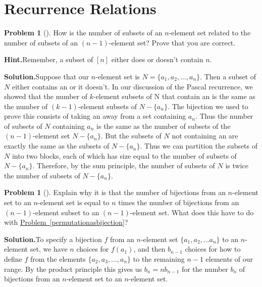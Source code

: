 \documentclass[10pt,]{book}
\theoremstyle{plain}
\theoremstyle{definition}
\newtheorem{activity}[project]{Problem}
\theoremstyle{definition}
\numberwithin{equation}{chapter}
\begin{document}
\section[{Recurrence Relations}]{Recurrence Relations}\label{sec_induction-recurrence}
\begin{activity}[]\label{activity-87}
How is the number of subsets of an \(n\)-element set related to the number of subsets of an \((n - 1)\)-element set? Prove that you are correct.%
\par\medskip\noindent%
\textbf{Hint.}\quad Remember, a subset of \([n]\) either does or doesn't contain \(n\).%
\par\medskip\noindent%
\textbf{Solution.}\quad Suppose that our \(n\)-element set is \(N = \{a_1,a_2,\dots ,a_n\}\). Then a subset of \(N\) either contains an or it doesn't. In our discussion of the Pascal recurrence, we showed that the number of \(k\)-element subsets of N that contain an is the same as the number of \((k - 1)\)-element subsets of \(N - \{a_n\}\). The bijection we used to prove this consists of taking an away from a set containing \(a_n\). Thus the number of subsets of \(N\) containing \(a_n\) is the same as the number of subsets of the \((n - 1)\)-element set \(N - \{a_n\}\). But the subsets of \(N\) not containing an are exactly the same as the subsets of \(N - \{a_n\}\). Thus we can partition the subsets of \(N\) into two blocks, each of which has size equal to the number of subsets of \(N - \{a_n\}\). Therefore, by the sum principle, the number of subsets of \(N\) is twice the number of subsets of \(N - \{a_n\}\).%
\end{activity}
\begin{activity}[]\label{activity-88}
Explain why it is that the number of bijections from an \(n\)-element set to an \(n\)-element set is equal to \(n\) times the number of bijections from an \((n-1)\)-element subset to an \((n-1)\)-element set. What does this have to do with \hyperref[permutationasbijection]{Problem~\ref{permutationasbijection}}?%
\par\medskip\noindent%
\textbf{Solution.}\quad To specify a bijection \(f\) from an \(n\)-element set \(\{a_1,a_2,
\ldots a_n\}\) to an \(n\)-element set, we have \(n\) choices for \(f(a_1)\), and then \(b_{n-1}\) choices for how to define \(f\) from the elements \(\{a_2,a_3, \ldots,a_n\}\) to the remaining \(n-1\) elements of our range. By the product principle this gives us \(b_n=nb_{n-1}\) for the number \(b_n\) of bijections from an \(n\)-element set to an \(n\)-element set.%
\end{activity}
\end{document}
